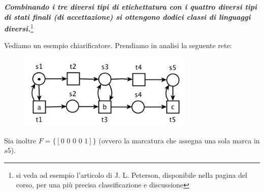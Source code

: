 \documentclass[a4paper,12pt, oneside]{book}
\begin{document}
\textit{\textbf{Combinando i tre diversi tipi di etichettatura con i quattro
    diversi tipi di stati finali (di accettazione) si ottengono dodici classi di
    linguaggi diversi.}}\footnote{si veda ad esempio l’articolo di
  J. L. Peterson, disponibile nella pagina del corso, per una più precisa
  classificazione e discussione} \\ 
\begin{esempio}
  Vediamo un esempio chiarificatore. Prendiamo in analisi la seguente rete:
  \begin{figure}[H]
    \centering
    \includegraphics[scale = 0.7]{img/l.jpg}
  \end{figure}
  Sia inoltre $F=\{[0\,\,0\,\,0\,\,0\,\,1]\}$ (ovvero la marcatura che assegna
  una sola marca in $s5$).
  

\end{esempio}
\end{document}
